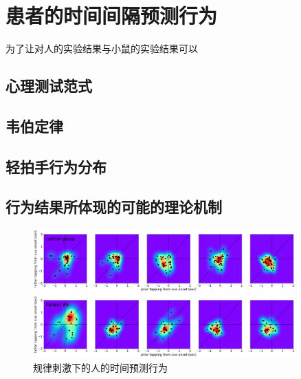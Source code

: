 \section{患者的时间间隔预测行为}
为了让对人的实验结果与小鼠的实验结果可以

\subsection{心理测试范式}

\subsection{韦伯定律}

\subsection{轻拍手行为分布}

\subsection{行为结果所体现的可能的理论机制}

\begin{figure}[h]
    \centering
    \includegraphics[width=0.9\textwidth]{src/figures/human_behavior_distribution_control.png}

    \includegraphics[width=0.9\textwidth]{src/figures/human_behavior_distribution_patient_6.png}

    \caption{规律刺激下的人的时间预测行为}
    \label{fig:human_behavior}
\end{figure}





